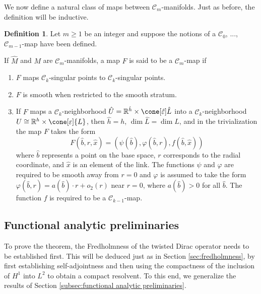 \documentclass[12pt, reqno]{amsart}
\theoremstyle{plain} %
\theoremstyle{definition}
\newtheorem{definition}[theorem]{Definition}
\theoremstyle{remark}
\numberwithin{equation}{section}
\newcommand{\dom}[1]{\hat{#1}}
\newcommand{\cat}[1]{\mathcal{#1}}
\newcommand{\field}[1]{\mathbb{#1}}
\newcommand{\R}{\field{R}}
\newcommand{\hdim}{h} %
\begin{document}
We now define a natural class of maps between \(\cat{C}_m\)-manifolds.
Just as before, the definition will be inductive.
\begin{definition}\label{def:Cm map}
    Let \(m \geq 1\) be an integer and suppose the notions of a \(\cat{C}_0\), ..., \(\cat{C}_{m-1}\)-map have been defined.

    If \(\dom{M}\) and \(M\) are \(\cat{C}_m\)-manifolds, a map \(F\) is said to be a \(\cat{C}_m\)-map if
    \begin{enumerate}
        \item \(F\) maps \(\cat{C}_k\)-singular points to \(\cat{C}_k\)-singular points.
        \item \(F\) is smooth when restricted to the smooth stratum.
        \item If \(F\) maps a \(\cat{C}_k\)-neighborhood \(\dom{U} = \R^{\dom{\hdim}} \times \cone[\dom{\varepsilon}]{\dom{L}}\) into a \(\cat{C}_k\)-neighborhood \(U \cong \R^\hdim \times \cone[\varepsilon]{L}\), then \(\dom{\hdim} = h\), \(\dim \dom{L} = \dim L\), and in the trivialization the map \(F\) takes the form
            \begin{equation*}
                F(\dom{b},r,\dom{x}) = (\psi(\dom{b}), \varphi(\dom{b},r), f(\dom{b},\dom{x}))
            \end{equation*}
        where \(\dom{b}\) represents a point on the base space, \(r\) corresponds to the radial coordinate, and \(\dom{x}\) is an element of the link.
        The functions \(\psi\) and \(\varphi\) are required to be smooth away from \(r=0\) and \(\varphi\) is assumed to take the form \(\varphi(\dom{b},r) = a(\dom{b}) \cdot r + o_2(r)\) near \(r=0\), where \(a(\dom{b})>0\) for all \(\dom{b}\).
        The function \(f\) is required to be a \(\cat{C}_{k-1}\)-map.
    \end{enumerate}
\end{definition}

\subsection{Functional analytic preliminaries}\label{subsec:functional analytic preliminaries - iacs manifolds}
To prove the theorem, the Fredholmness of the twisted Dirac operator needs to be established first.
This will be deduced just as in Section \ref{sec:fredholmness}, by first establishing self-adjointness and then using the compactness of the inclusion of \(H^1\) into \(L^2\) to obtain a compact resolvent.
To this end, we generalize the results of Section \ref{subsec:functional analytic preliminaries}.
\end{document}
